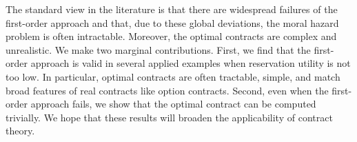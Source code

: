 The standard view in the literature is that there are widespread failures of the first-order approach and that, due to these global deviations, the moral hazard problem is often intractable. Moreover, the optimal contracts are complex and unrealistic. We make two marginal contributions. First, we find that the first-order approach is valid in several applied examples when reservation utility is not too low. In particular, optimal contracts are often tractable, simple, and match broad features of real contracts like option contracts. Second, even when the first-order approach fails, we show that the optimal contract can be computed trivially. We hope that these results will broaden the applicability of contract theory.
